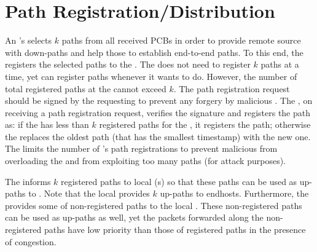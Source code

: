 


\section{Path Registration/Distribution}
An \AD's \BS selects $k$ paths from all received PCBs in order to provide remote source \ADs with down-paths and help those \ADs to establish end-to-end paths. To this end, the \BS registers the selected paths to the \ISDC \PS. The \BS does not need to register $k$ paths at a time, yet can register paths whenever it wants to do. However, the number of total registered paths at the \ISDC \PS cannot exceed $k$. The path registration request should be signed by the requesting \AD to prevent any forgery by malicious \ADs. The \ISDC \PS, on receiving a path registration request, verifies the signature and registers the path as: if the \PS has less than $k$ registered paths for the \AD, it registers the path; otherwise the \PS replaces the oldest path (that has the smallest timestamp) with the new one. The \PS limits the number of \AD's path registrations to prevent malicious \ADs from overloading the \ISDC \PS and from exploiting too many paths (for attack purposes).

The \BS informs $k$ registered paths to local \PS(s) so that these paths can be used as up-paths to \ISDC. Note that the local \PS provides $k$ up-paths to endhosts. Furthermore, the \BS provides some of non-registered paths to the local \PS. These non-registered paths can be used as up-paths as well, yet the packets forwarded along the non-registered paths have low priority than those of registered paths in the presence of congestion. 

